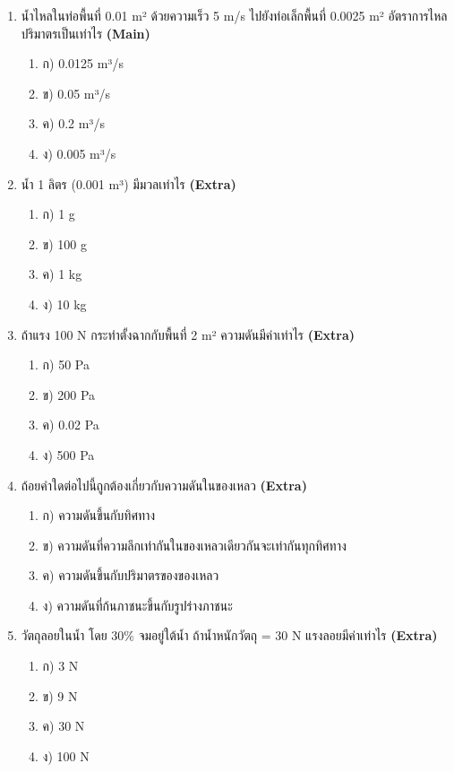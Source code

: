 \documentclass[12pt]{article}
\begin{document}
\begin{enumerate}[label=\arabic*.]
\begin{enumerate}[label=)]
\end{enumerate}
\item น้ำไหลในท่อพื้นที่ 0.01 m² ด้วยความเร็ว 5 m/s ไปยังท่อเล็กพื้นที่ 0.0025 m² อัตราการไหลปริมาตรเป็นเท่าไร \hfill \textbf{\small (Main)}
\begin{enumerate}[label=)]
\item ก) 0.0125 m³/s
\item ข) 0.05 m³/s
\item ค) 0.2 m³/s
\item ง) 0.005 m³/s
\end{enumerate}
\item น้ำ 1 ลิตร (0.001 m³) มีมวลเท่าไร \hfill \textbf{\small (Extra)}
\begin{enumerate}[label=)]
\item ก) 1 g
\item ข) 100 g
\item ค) 1 kg
\item ง) 10 kg
\end{enumerate}
\item ถ้าแรง 100 N กระทำตั้งฉากกับพื้นที่ 2 m² ความดันมีค่าเท่าไร \hfill \textbf{\small (Extra)}
\begin{enumerate}[label=)]
\item ก) 50 Pa
\item ข) 200 Pa
\item ค) 0.02 Pa
\item ง) 500 Pa
\end{enumerate}
\item ถ้อยคำใดต่อไปนี้ถูกต้องเกี่ยวกับความดันในของเหลว \hfill \textbf{\small (Extra)}
\begin{enumerate}[label=)]
\item ก) ความดันขึ้นกับทิศทาง
\item ข) ความดันที่ความลึกเท่ากันในของเหลวเดียวกันจะเท่ากันทุกทิศทาง
\item ค) ความดันขึ้นกับปริมาตรของของเหลว
\item ง) ความดันที่ก้นภาชนะขึ้นกับรูปร่างภาชนะ
\end{enumerate}
\item วัตถุลอยในน้ำ โดย 30\% จมอยู่ใต้น้ำ ถ้าน้ำหนักวัตถุ = 30 N แรงลอยมีค่าเท่าไร \hfill \textbf{\small (Extra)}
\begin{enumerate}[label=)]
\item ก) 3 N
\item ข) 9 N
\item ค) 30 N
\item ง) 100 N
\end{enumerate}

\end{enumerate}
\end{document}
